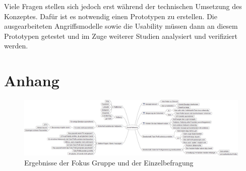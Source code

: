 \documentclass{sigchi}
\begin{document}
Viele Fragen stellen sich jedoch erst während der technischen Umsetzung des Konzeptes. Dafür ist es notwendig einen Prototypen zu erstellen. Die ausgearbeiteten Angriffsmodelle sowie die Usability müssen dann an diesem Prototypen getestet und im Zuge weiterer Studien analysiert und verifiziert werden.





\balance{}





\clearpage
\section{Anhang}
\begin{figure}[h]
	\centering
	\includegraphics[width=2\columnwidth]{figures/Social-Networks.png}
	\caption{Ergebnisse der Fokus Gruppe und der Einzelbefragung}
	\label{fig:MindMapAnhang}
\end{figure}
\end{document}
